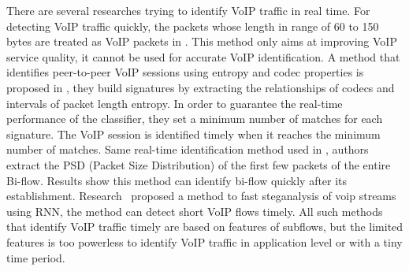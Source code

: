 \documentclass[conference]{IEEEtran}
\begin{document}
There are several researches trying to identify VoIP traffic in real time. For detecting VoIP traffic quickly, the packets whose length in range of 60 to 150 bytes are treated as VoIP packets in \cite{3}. This method only aims at improving VoIP service quality, it cannot be used for accurate VoIP identification. A method that identifies peer-to-peer VoIP sessions using entropy and codec properties is proposed in \cite{4}, they build signatures by extracting the relationships of codecs and intervals of
packet length entropy. In order to guarantee the real-time performance of the classifier, they set a minimum number of matches for each signature. The VoIP session is identified timely when it reaches the minimum number of matches. Same real-time identification method used in \cite{22}, authors extract the PSD (Packet Size Distribution) of the first few packets of the entire Bi-flow. Results show this method can identify bi-flow quickly after its establishment. Research~\cite{lin2018rnn} proposed a method to fast steganalysis of voip streams using RNN, the method can detect short VoIP flows timely. All such methods that identify VoIP traffic timely are based on features of subflows, but the limited features is too powerless to identify VoIP traffic in application level or with a tiny time period.


\end{document}
